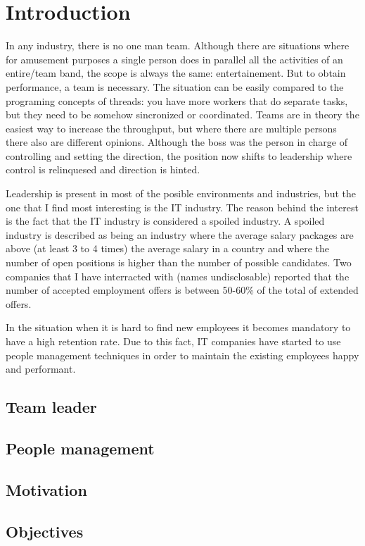 \chapter{Introduction}
\label{chapter:intro}
In any industry, there is no one man team. Although there are situations where for amusement purposes a single person does in parallel all the activities of an entire/team band, the scope is always the same: entertainement. But to obtain performance, a team is necessary. The situation can be easily compared to the programing concepts of threads: you have more workers that do separate tasks, but they need to be somehow sincronized or coordinated. Teams are in theory the easiest way to increase the throughput, but where there are multiple persons there also are different opinions. Although the boss was the person in charge of controlling and setting the direction, the position now shifts to leadership where control is relinquesed and direction is hinted.

Leadership is present in most of the posible environments and industries, but the one that I find most interesting is the IT industry. The reason behind the interest is the fact that the IT industry is considered a spoiled industry. A spoiled industry is described as being an industry where the average salary packages are above (at least 3 to 4 times) the average salary in a country and where the number of open positions is higher than the number of possible candidates. Two companies that I have interracted with (names undisclosable) reported that the number of accepted employment offers is between 50-60\% of the total of extended offers. 

In the situation when it is hard to find new employees it becomes mandatory to have a high retention rate. Due to this fact, IT companies have started to use people management techniques in order to maintain the existing employees happy and performant.

\section{Team leader}
\label{sec:tl}
\cite{abur-tl}
\section{People management}
\label{sec:proj-scope}
\cite{abur-pm}
\section{Motivation}
\label{sec:motivation}

\section{Objectives}
\label{sec:Objectives}

